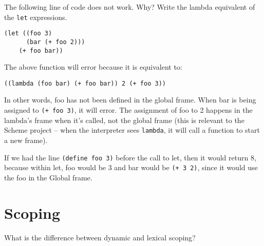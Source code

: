 \documentclass{exam}
\begin{document}
\begin{questions}
\begin{parts}
\end{parts}

\begin{blocksection}
\question The following line of code does not work. Why? Write the lambda
equivalent of the \texttt{let} expressions.

\begin{lstlisting}
(let ((foo 3)
      (bar (+ foo 2)))
    (+ foo bar))
\end{lstlisting}
\begin{solution}[0.5in]
The above function will error because it is equivalent to:
\begin{lstlisting}
((lambda (foo bar) (+ foo bar)) 2 (+ foo 3))
\end{lstlisting}

In other words, foo has not been defined in the global frame. When bar is being
assigned to \texttt{(+ foo 3)}, it will error. The assignment of foo to 2
happens in the lambda’s frame when it's called, not the global frame (this is
relevant to the Scheme project -- when the interpreter sees \texttt{lambda}, it
will call a function to start a new frame).

If we had the line \texttt{(define foo 3)} before the call to let, then it would
return 8, because within let, foo would be 3 and bar would be \texttt{(+ 3 2)},
since it would use the foo in the Global frame.
\end{solution}

\end{blocksection}

\section{Scoping}

\begin{blocksection}
\question What is the difference between dynamic and lexical scoping?


\end{blocksection}
\end{questions}
\end{document}
